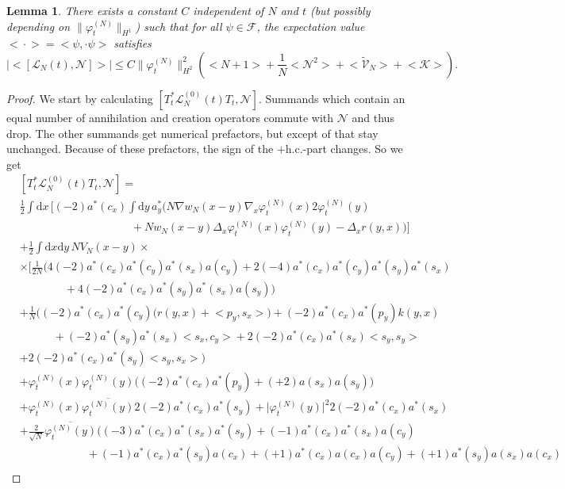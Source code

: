 \documentclass[11pt,a4paper]{scrartcl}
\newtheorem{lem}[thm]{Lemma}
\newcommand{\fock}{\mathcal{F}}		%
\newcommand{\di}{\textrm{d}}		%
\newcommand{\Lcal}{\mathcal{L}}		%
\newcommand{\Ncal}{\mathcal{N}}		%
\newcommand{\Kcal}{\mathcal{K}}		%
\newcommand{\tilV}{\tilde{\mathcal{V}}_N}		%
\newcommand{\hc}{\mbox{h.c.}}		%
\newcommand{\scal}[2]{\big<#1,#2\big>} %
\newcommand{\cc}[1]{\overline{#1}}	%
\newcommand{\norm}[1]{\lVert#1\rVert}	%
\newcommand{\ev}[1]{\big<#1\big>}	%
\newcommand{\ph}{\varphi_t^{(N)}}	%
\newcommand{\bd}{\begin{displaymath}}			%
\newcommand{\ed}{\end{displaymath}}
\begin{document}
\begin{lem}
\label{lem:lncommutatorbound}
There exists a constant $C$ independent of $N$ and $t$ (but possibly depending on $\norm{\ph}_{H^1}$) such that for all $\psi \in \fock$, the expectation value $\ev{\cdot} = \scal{\psi}{\cdot\psi}$ satisfies
 \bd
  \lvert \ev{[\Lcal_N(t),\Ncal]} \rvert \leq C \norm{\ph}_{H^2}^2 \left( \ev{N+1} + \frac{1}{N}\ev{\Ncal^2} + \ev{\tilV} + \ev{\Kcal} \right).
 \ed
\end{lem}
\begin{proof}
We start by calculating $[T^\ast_t \Lcal_N^{(0)}(t)T_t,\Ncal]$. Summands which contain an equal number of annihilation and creation operators commute with $\Ncal$ and thus drop. The other summands get numerical prefactors, but except of that stay unchanged. Because of these prefactors, the sign of the $+\hc$-part changes. So we get
\begin{align*}
& [T^\ast_t \Lcal_N^{(0)}(t) T_t,\Ncal] = \\ 
& \frac{1}{2} \int \di x\, \bigg[(-2) a^*(c_x) \int \di y\, a^*_y \Big( N \nabla w_N(x-y) \nabla_x \ph(x) 2 \ph(y) \\
& \qquad\qquad \qquad\qquad \qquad	+ Nw_N(x-y) \Delta_x \ph(x) \ph(y) - \Delta_x r(y,x) \Big)\bigg] \\
& + \frac{1}{2}\int \di x \di y\, NV_N(x-y) \times \\
& \times \Big[   \frac{1}{2N}\bigg( 4(-2) a^*(c_x) a^*(c_y) a^*(s_x) a(c_y) + 2(-4) a^*(c_x) a^*(c_y) a^*(s_y) a^*(s_x)\\
				      & \qquad\qquad + 4(-2) a^*(c_x) a^*(s_y) a^*(s_x) a(s_y)\bigg) \\
& + \frac{1}{N}\bigg(  (-2) a^*(c_x) a^*(c_y) \Big( r(y,x) + \scal{p_y}{s_x} \Big) + (-2)a^*(c_x) a^*(p_y) k(y,x) \\
      & \qquad\quad + (-2)a^*(s_y) a^*(s_x) \scal{s_x}{c_y} + 2(-2)a^*(c_x)
  a^*(s_x) \scal{s_y}{s_y} \\
& + 2(-2)a^*(c_x)a^*(s_y) \scal{s_y}{s_x} \bigg)\\
& + \ph(x)\ph(y) \Big( (-2) a^*(c_x) a^*(p_y) +(+2)a(s_x) a(s_y) \Big)\\
& + \ph(x) \cc{\ph(y)} 2(-2) a^*(c_x) a^*(s_y) + \lvert \ph(y) \rvert^2 2(-2) a^*(c_x) a^*(s_x)\\
& + \frac{2}{\sqrt{N}}\cc{\ph(y)} \bigg(    (-3)a^*(c_x) a^*(s_x) a^*(s_y) + (-1)a^*(c_x) a^*(s_x) a(c_y)\\
					    & \qquad\qquad\qquad + (-1)a^*(c_x) a^*(s_y) a(c_x) + (+1)a^*(c_x) a(c_x) a(c_y) + (+1)a^*(s_y) a(s_x) a(c_x)\\

\end{align*}
\end{proof}
\end{document}
